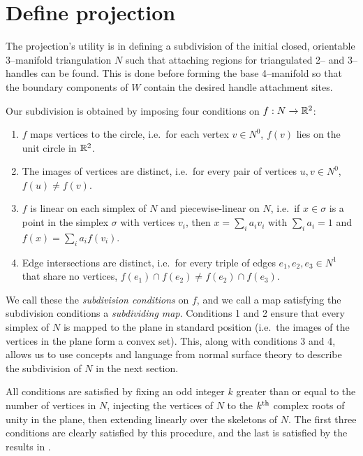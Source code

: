 \section{Define projection}
\label{section:pl-projection}

The projection's utility is in defining a subdivision of the initial closed, orientable 3--manifold triangulation $N$ such that attaching regions for triangulated 2-- and 3--handles can be found.
This is done before forming the base 4--manifold so that the boundary components of $W$ contain the desired handle attachment sites.

Our subdivision is obtained by imposing four conditions on $f:N\to\mathbb{R}^2$:
\begin{enumerate}
	\item $f$ maps vertices to the circle, i.e.\ for each vertex $v\in N^0$, $f(v)$ lies on the unit circle in $\mathbb{R}^2$.
	
	\item The images of vertices are distinct, i.e.\ for every pair of vertices $u,v\in N^0$, $f(u)\neq f(v)$.
	
	\item $f$ is linear on each simplex of $N$ and piecewise-linear on $N$, i.e.\ if $x\in\sigma$ is a point in the simplex $\sigma$ with vertices $v_i$, then $x=\sum_i a_i v_i$ with $\sum_i a_i = 1$ and $f(x) = \sum_i a_i f(v_i)$.
	
	\item Edge intersections are distinct, i.e.\ for every triple of edges $e_1, e_2, e_3\in N^1$ that share no vertices, $f(e_1)\cap f(e_2)\neq f(e_2)\cap f(e_3)$.
\end{enumerate}

We call these the \emph{subdivision conditions} on $f$, and we call a map satisfying the subdivision conditions a \emph{subdividing map}.
Conditions 1 and 2 ensure that every simplex of $N$ is mapped to the plane in standard position (i.e.\ the images of the vertices in the plane form a convex set).
This, along with conditions 3 and 4, allows us to use concepts and language from normal surface theory to describe the subdivision of $N$ in the next section.

All conditions are satisfied by fixing an odd integer $k$ greater than or equal to the number of vertices in $N$, injecting the vertices of $N$ to the $k^{\text{th}}$ complex roots of unity in the plane, then extending linearly over the skeletons of $N$.
The first three conditions are clearly satisfied by this procedure, and the last is satisfied by the results in \cite{PoonRub98}.

